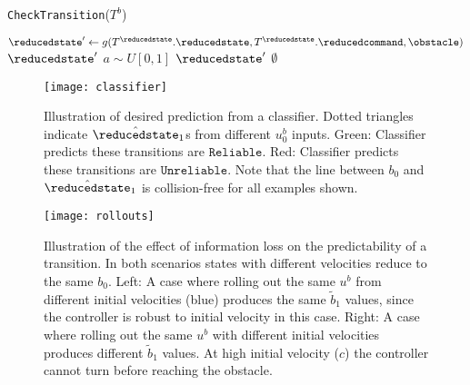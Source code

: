 \begin{algorithm}[t]
\caption{\strut \texttt{CheckTransition}($T^b$)}%
\begin{algorithmic}[1]
    \algtext*{EndIf}
    \State $\reducedstate' \gets g(T^\reducedstate.\reducedstate,  T^\reducedstate.\reducedcommand, \obstacle)$
    \If {\texttt{Classify}$(T^\reducedstate) ==$ \texttt{Reliable}}
        \State \Return $\reducedstate'$
    \EndIf
    \State $a \sim U[0, 1]$
    \If {$a < e^{-k p_{\text{acc}}}$}
        \State \Return $\reducedstate'$
    \EndIf
    \State \Return \texttt{$\emptyset$}
\end{algorithmic}
\label{alg:checktransition}
\end{algorithm}

\begin{figure}[t]
    \centering
    \texttt{[image: classifier]}
    \vspace{-0.05in}
    \caption{Illustration of desired prediction from a classifier. Dotted triangles indicate $\hat{\reducedstate}_1$s from different $u^b_0$ inputs. Green: Classifier predicts these transitions are $\texttt{Reliable}$. Red: Classifier predicts these transitions are $\texttt{Unreliable}$. Note that the line between $b_0$ and $\hat{\reducedstate}_1$ is collision-free for all examples shown.}
    \label{fig:classifier}
    \vspace{0.1in}
    \centering
    \texttt{[image: rollouts]}
    \caption{Illustration of the effect of information loss on the predictability of a transition. In both scenarios states with different velocities reduce to the same $b_0$. Left: A case where rolling out the same $u^b$ from different initial velocities (blue) produces the same $\tilde{b}_1$ values, since the controller is robust to initial velocity in this case. Right: A case where rolling out the same $u^b$ with different initial velocities produces different $\tilde{b}_1$ values. At high initial velocity ($c$) the controller cannot turn before reaching the obstacle.}
    \label{fig:cars}
\end{figure}


